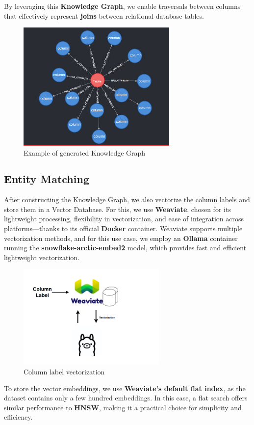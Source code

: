 By leveraging this \textbf{Knowledge Graph}, we enable traversals between columns that effectively represent \textbf{joins} between relational database tables.
\begin{figure}[h]
    \centering
\includegraphics[width=0.7\textwidth]{IMAGES/KGschema.JPG}
    \caption{Example of generated Knowledge Graph}
    \label{fig:Knowledge Graph}
\end{figure}


\subsection{Entity Matching}
After constructing the Knowledge Graph, we also vectorize the column labels and store them in a Vector Database. For this, we use \textbf{Weaviate}, chosen for its lightweight processing, flexibility in vectorization, and ease of integration across platforms—thanks to its official \textbf{Docker} container. Weaviate supports multiple vectorization methods, and for this use case, we employ an \textbf{Ollama} container running the \textbf{snowflake-arctic-embed2} model, which provides fast and efficient lightweight vectorization.
\begin{figure}[h]
    \centering
\includegraphics[width=0.65\textwidth]{IMAGES/immagine_2025-03-27_153710010.png}
    \caption{Column label vectorization}
    \label{fig:Vectorization}
\end{figure}
To store the vector embeddings, we use \textbf{Weaviate’s default flat index}, as the dataset contains only a few hundred embeddings. In this case, a flat search offers similar performance to \textbf{HNSW}, making it a practical choice for simplicity and efficiency.

